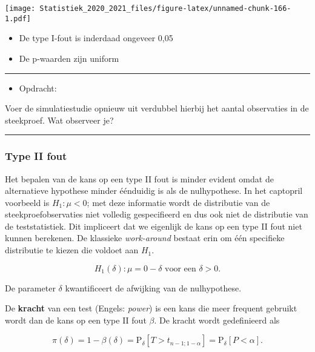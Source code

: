 \documentclass[
  12pt,dutch,coursenotes]{book}
\providecommand{\tightlist}{%
  \setlength{\itemsep}{0pt}\setlength{\parskip}{0pt}}
\theoremstyle{definition}
\theoremstyle{definition}
\theoremstyle{definition}
\theoremstyle{remark}
\begin{document}
\texttt{[image: Statistiek\_2020\_2021\_files/figure-latex/unnamed-chunk-166-1.pdf]}

\begin{itemize}
\tightlist
\item
  De type I-fout is inderdaad ongeveer 0,05
\item
  De p-waarden zijn uniform
\end{itemize}

\begin{center}\rule{0.5\linewidth}{0.5pt}\end{center}

\begin{itemize}
\tightlist
\item
  Opdracht:
\end{itemize}

Voer de simulatiestudie opnieuw uit verdubbel hierbij het aantal observaties in de steekproef. Wat observeer je?

\begin{center}\rule{0.5\linewidth}{0.5pt}\end{center}

\hypertarget{type-ii-fout}{%
\subsubsection{Type II fout}\label{type-ii-fout}}

Het bepalen van de kans op een type II fout is minder evident omdat de alternatieve hypothese minder éénduidig is als de nulhypothese. In het captopril voorbeeld is \(H_1: \mu<0\); met deze informatie wordt de distributie van de steekproefobservaties niet volledig gespecifieerd en dus ook niet de distributie van de teststatistiek. Dit impliceert dat we eigenlijk de kans op een type II fout niet kunnen berekenen. De klassieke \emph{work-around} bestaat erin om één specifieke distributie te kiezen die voldoet aan \(H_1\).

\[H_1(\delta): \mu=0-\delta \text{ voor een }\delta>0.\]

De parameter \(\delta\) kwantificeert de afwijking van de nulhypothese.

De \textbf{kracht} van een test (Engels: \emph{power}) is een kans die meer frequent gebruikt wordt dan de kans op een type II fout \(\beta\). De kracht wordt gedefinieerd als

\[\pi(\delta) = 1-\beta(\delta) = \text{P}_\delta\left[T>t_{n-1;1-\alpha}\right]=\text{P}_\delta\left[P<\alpha\right].\]
\end{document}
